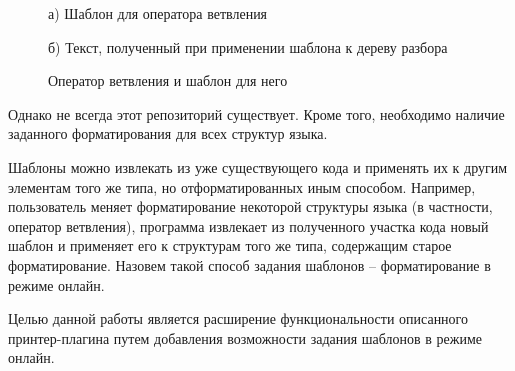 \begin{figure}[ht]
\noindent\begin{minipage}{.5\textwidth}
    
\caption*{а) Шаблон для оператора ветвления}    
\end{minipage}\hfill
\begin{minipage}{.5\textwidth}
    
\caption*{б) Текст, полученный при применении шаблона к дереву разбора}    
\end{minipage}
\caption{Оператор ветвления и шаблон для него}    
\label{fig:tmpltcodeintro}
\end{figure}

Однако не всегда этот репозиторий существует. Кроме того, необходимо наличие заданного форматирования для всех структур языка.

Шаблоны можно извлекать из уже существующего кода и применять их к другим элементам того же типа, но отформатированных иным способом. 
Например, пользователь меняет форматирование некоторой структуры языка (в частности, оператор ветвления), программа извлекает из полученного участка кода новый шаблон и применяет его к структурам того же типа, содержащим старое форматирование. 
Назовем такой способ задания шаблонов -- форматирование в режиме
онлайн.

Целью данной работы является расширение функциональности описанного 
принтер-плагина путем добавления возможности задания шаблонов в режиме онлайн. 